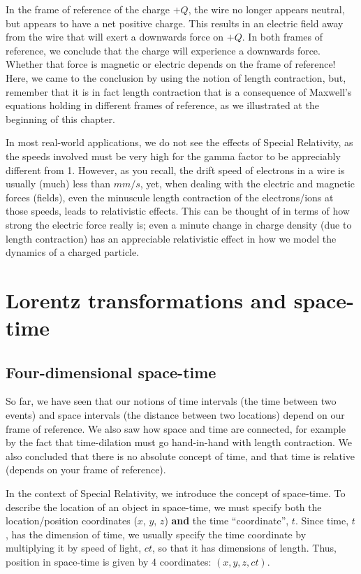 In the frame of reference of the charge $+Q$, the wire no longer appears neutral, but appears to have a net positive charge. This results in an electric field away from the wire that will exert a downwards force on $+Q$. In both frames of reference, we conclude that the charge will experience a downwards force. Whether that force is magnetic or electric depends on the frame of reference! Here, we came to the conclusion by using the notion of length contraction, but, remember that it is in fact length contraction that is a consequence of Maxwell's equations holding in different frames of reference, as we illustrated at the beginning of this chapter. 

In most real-world applications, we do not see the effects of Special Relativity, as the speeds involved must be very high for the gamma factor to be appreciably different from 1. However, as you recall, the drift speed of electrons in a wire is usually (much) less than $\si{mm/s}$, yet, when dealing with the electric and magnetic forces (fields), even the minuscule length contraction of the electrons/ions at those speeds, leads to relativistic effects. This can be thought of in terms of how strong the electric force really is; even a minute change in charge density (due to length contraction) has an appreciable relativistic effect in how we model the dynamics of a charged particle.

\section{Lorentz transformations and space-time}
\subsection{Four-dimensional space-time}
So far, we have seen that our notions of time intervals (the time between two events) and space intervals (the distance between two locations) depend on our frame of reference. We also saw how space and time are connected, for example by the fact that time-dilation must go hand-in-hand with length contraction. We also concluded that there is no absolute concept of time, and that time is relative (depends on your frame of reference). 

In the context of Special Relativity, we introduce the concept of space-time. To describe the location of an object in space-time, we must specify both the location/position coordinates ($x$, $y$, $z$) \textbf{and} the time ``coordinate'', $t$. Since time, $t$, has the dimension of time, we usually specify the time coordinate by multiplying it by speed of light, $ct$, so that it has dimensions of length. Thus, position in space-time is given by 4 coordinates: $(x,y,z,ct)$.

